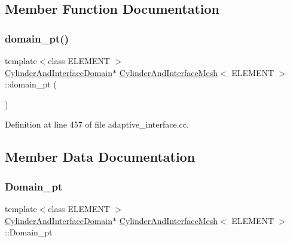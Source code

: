 \subsection{Member Function Documentation}
\mbox{\label{classCylinderAndInterfaceMesh_a924b3538d9f6c8b8524c317c5e2aa380}} 
\subsubsection{\texorpdfstring{domain\+\_\+pt()}{domain\_pt()}}
{\footnotesize\ttfamily template$<$class E\+L\+E\+M\+E\+NT $>$ \\
\hyperlink{classCylinderAndInterfaceDomain}{Cylinder\+And\+Interface\+Domain}$\ast$ \hyperlink{classCylinderAndInterfaceMesh}{Cylinder\+And\+Interface\+Mesh}$<$ E\+L\+E\+M\+E\+NT $>$\+::domain\+\_\+pt (\begin{DoxyParamCaption}{ }\end{DoxyParamCaption})\hspace{0.3cm}{\ttfamily [inline]}}



Definition at line 457 of file adaptive\+\_\+interface.\+cc.



\subsection{Member Data Documentation}
\mbox{\label{classCylinderAndInterfaceMesh_aa7b43c0cab4ffc92bb47813a8e255374}} 
\subsubsection{\texorpdfstring{Domain\+\_\+pt}{Domain\_pt}}
{\footnotesize\ttfamily template$<$class E\+L\+E\+M\+E\+NT $>$ \\
\hyperlink{classCylinderAndInterfaceDomain}{Cylinder\+And\+Interface\+Domain}$\ast$ \hyperlink{classCylinderAndInterfaceMesh}{Cylinder\+And\+Interface\+Mesh}$<$ E\+L\+E\+M\+E\+NT $>$\+::Domain\+\_\+pt\hspace{0.3cm}{\ttfamily [protected]}}



